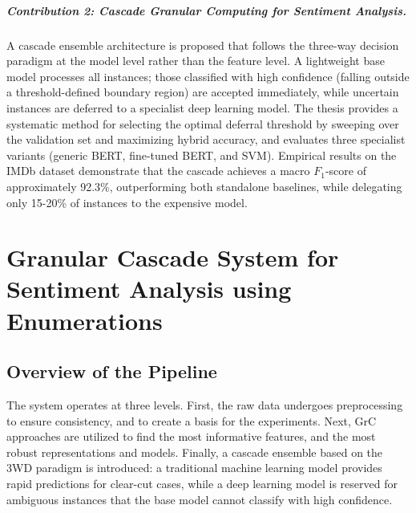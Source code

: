 \documentclass[a4paper,twoside,12pt]{book}
\begin{document}
\paragraph{Contribution 2: Cascade Granular Computing for Sentiment Analysis.}
A cascade ensemble architecture is proposed that follows the three-way decision paradigm at the model level rather than the feature level. A lightweight base model processes all instances; those classified with high confidence (falling outside a threshold-defined boundary region) are accepted immediately, while uncertain instances are deferred to a specialist deep learning model. The thesis provides a systematic method for selecting the optimal deferral threshold by sweeping over the validation set and maximizing hybrid accuracy, and evaluates three specialist variants (generic BERT, fine-tuned BERT, and SVM). Empirical results on the IMDb dataset demonstrate that the cascade achieves a macro $F_1$-score of approximately 92.3\%, outperforming both standalone baselines, while delegating only 15-20\% of instances to the expensive model.

\chapter{Granular Cascade System for Sentiment Analysis using Enumerations} \label{chap:system}
\section{Overview of the Pipeline}

The system operates at three levels. First, the raw data undergoes preprocessing to ensure consistency, and to create a basis for the experiments. Next, GrC approaches are utilized to find the most informative features, and the most robust representations and models. Finally, a cascade ensemble based on the 3WD paradigm is introduced: a traditional machine learning model provides rapid predictions for clear-cut cases, while a deep learning model is reserved for ambiguous instances that the base model cannot classify with high confidence.
\end{document}
